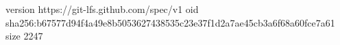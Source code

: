 version https://git-lfs.github.com/spec/v1
oid sha256:b67577d94f4a49e8b5053627438535c23e37f1d2a7ae45cb3a6f68a60fce7a61
size 2247

